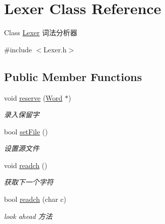 \hypertarget{class_lexer}{}\section{Lexer Class Reference}
\label{class_lexer}


Class \hyperlink{class_lexer}{Lexer} 词法分析器  




{\ttfamily \#include $<$Lexer.\+h$>$}

\subsection*{Public Member Functions}
\begin{DoxyCompactItemize}
\item 
\mbox{\label{class_lexer_ae96c693bf6eba38f21adab5fc94c18b1}} 
void \hyperlink{class_lexer_ae96c693bf6eba38f21adab5fc94c18b1}{reserve} (\hyperlink{class_word}{Word} $\ast$)
\begin{DoxyCompactList}\small\item\em 录入保留字 \end{DoxyCompactList}\item 
\mbox{\label{class_lexer_a3fafe4fb32f4da95a08d1062996b0409}} 
bool \hyperlink{class_lexer_a3fafe4fb32f4da95a08d1062996b0409}{set\+File} ()
\begin{DoxyCompactList}\small\item\em 设置源文件 \end{DoxyCompactList}\item 
\mbox{\label{class_lexer_a5c91a26ad6b4294bf7bb8d4c46ea529b}} 
void \hyperlink{class_lexer_a5c91a26ad6b4294bf7bb8d4c46ea529b}{readch} ()
\begin{DoxyCompactList}\small\item\em 获取下一个字符 \end{DoxyCompactList}\item 
bool \hyperlink{class_lexer_acbe68a5d98ebc3b3a87fd27f000030a5}{readch} (char c)
\begin{DoxyCompactList}\small\item\em look ahead 方法 \end{DoxyCompactList}\item 
\mbox{\label{class_lexer_ae28380e5c67144a1aeaf37f33ab11fb2}} 

\end{DoxyCompactItemize}
